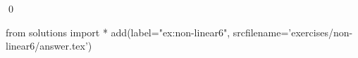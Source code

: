 
\begin{ex} 
  \label{ex:non-linear6}
  
  \qed
\end{ex} 
\begin{python0}
from solutions import *
add(label="ex:non-linear6",
    srcfilename='exercises/non-linear6/answer.tex') 
\end{python0}
